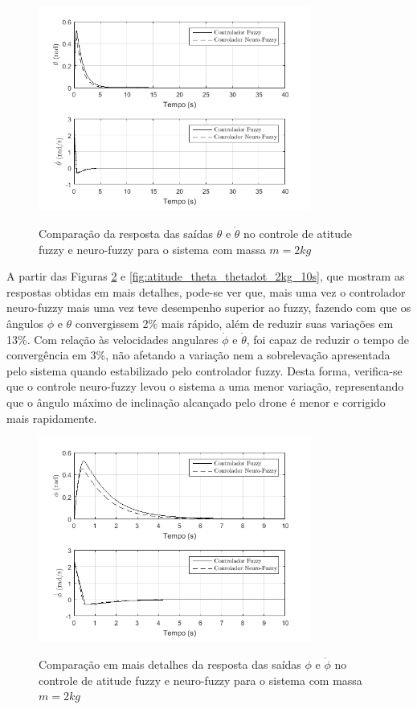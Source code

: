 \begin{figure}[!htb]
    \centering
    \caption{Comparação da resposta das saídas $\theta$ e $\dot{\theta}$ no controle de atitude fuzzy e neuro-fuzzy para o sistema com massa $m=2kg$}
    \includegraphics[width=0.8\textwidth]{./04-figuras/resultados/novos/atitude_theta_thetadot_2kg_40s}
    \label{fig:atitude_theta_thetadot_2kg_40s}
\end{figure}

A partir das Figuras \ref{fig:atitude_phi_phidot_2kg_10s} e \ref{fig:atitude_theta_thetadot_2kg_10s}, que mostram as respostas obtidas em mais detalhes, pode-se ver que, mais uma vez o controlador neuro-fuzzy mais uma vez teve desempenho superior ao fuzzy, fazendo com que os ângulos $\phi$ e $\theta$ convergissem 2\% mais rápido, além de reduzir suas variações em 13\%. Com relação às velocidades angulares $\dot{\phi}$ e $\dot{\theta}$, foi capaz de reduzir o tempo de convergência em 3\%, não afetando a variação nem a sobrelevação apresentada pelo sistema quando estabilizado pelo controlador fuzzy. Desta forma, verifica-se que o controle neuro-fuzzy levou o sistema a uma menor variação, representando que o ângulo máximo de inclinação alcançado pelo drone é menor e corrigido mais rapidamente.

\begin{figure}[!htb]
    \centering
    \caption{Comparação em mais detalhes da resposta das saídas $\phi$ e $\dot{\phi}$ no controle de atitude fuzzy e neuro-fuzzy para o sistema com massa $m=2kg$}
    \includegraphics[width=0.8\textwidth]{./04-figuras/resultados/novos/atitude_phi_phidot_2kg_10s}
    \label{fig:atitude_phi_phidot_2kg_10s}
\end{figure}

